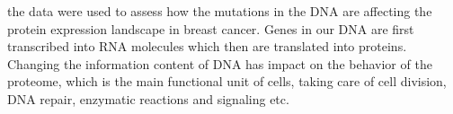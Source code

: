 the data were used to assess how the mutations in the DNA are affecting the protein expression landscape in breast cancer. Genes in our DNA are first transcribed into RNA molecules which then are translated into proteins. Changing the information content of DNA has impact on the behavior of the proteome, which is the main functional unit of cells, taking care of cell division, DNA repair, enzymatic reactions and signaling etc.
